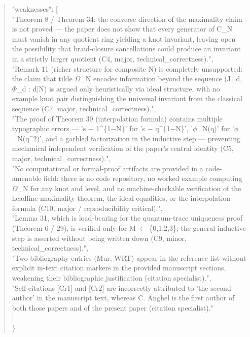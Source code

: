 \documentclass[11pt]{article}
\begin{document}
\begin{quote}
  "weaknesses": [\\
    "Theorem 8 / Theorem 34: the converse direction of the maximality claim is not proved --- the paper does not show that every generator of C\_N must vanish in any quotient ring yielding a knot invariant, leaving open the possibility that braid-closure cancellations could produce an invariant in a strictly larger quotient (C4, major, technical\_correctness).",\\
    "Remark 11 (richer structure for composite N) is completely unsupported: the claim that tilde \ensuremath{\Omega}\_N encodes information beyond the sequence (J\_d, \ensuremath{\Phi}\_d : d|N) is argued only heuristically via ideal structure, with no example knot pair distinguishing the universal invariant from the classical sequence (C7, major, technical\_correctness).",\\
    "The proof of Theorem 39 (interpolation formula) contains multiple typographic errors --- 's \ensuremath{-} 1\^{}\{1\ensuremath{-}N\}' for 's \ensuremath{-} q\^{}\{1\ensuremath{-}N\}', '\ensuremath{\phi}\_N(q)' for '\ensuremath{\phi}\_N(q\^{}2)', and a garbled factorization in the inductive step --- preventing mechanical independent verification of the paper's central identity (C5, major, technical\_correctness).",\\
    "No computational or formal-proof artifacts are provided in a code-amenable field: there is no code repository, no worked example computing \ensuremath{\Omega}\_N for any knot and level, and no machine-checkable verification of the headline maximality theorem, the ideal equalities, or the interpolation formula (C10, major / reproducibility critical).",\\
    "Lemma 31, which is load-bearing for the quantum-trace uniqueness proof (Theorem 6 / 29), is verified only for M \ensuremath{\in} \{0,1,2,3\}; the general inductive step is asserted without being written down (C9, minor, technical\_correctness).",\\
    "Two bibliography entries (Mur, WRT) appear in the reference list without explicit in-text citation markers in the provided manuscript sections, weakening their bibliographic justification (citation specialist).",\\
    "Self-citations [Cr1] and [Cr2] are incorrectly attributed to 'the second author' in the manuscript text, whereas C. Anghel is the first author of both those papers and of the present paper (citation specialist)."\\
  ]\\
\}\\
\end{quote}
\end{document}
